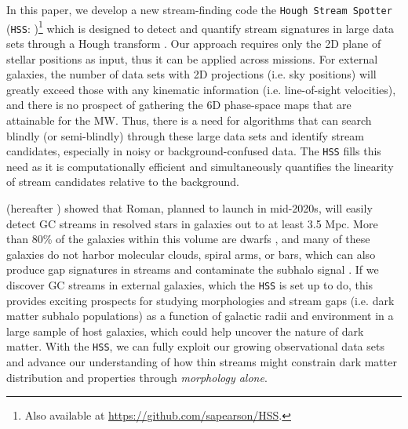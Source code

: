 \documentclass[twocolumn]{aastex631}
\begin{document}
In this paper, we develop a new stream-finding code the \texttt{Hough Stream Spotter} (\texttt{HSS}: \citealt{Pearson2021})\footnote{Also available at \url{https://github.com/sapearson/HSS}.} which is designed to detect and quantify stream signatures in large data sets through a Hough transform \citep{hough62}. Our approach requires only the 2D plane of stellar positions as input, thus it can be applied across missions. 
For external galaxies, the number of data sets with 2D projections (i.e. sky positions) will greatly exceed those with any kinematic information (i.e. line-of-sight velocities), and there is no prospect of gathering the 6D phase-space maps that are attainable for the MW. Thus, there is a need for algorithms that can search blindly (or semi-blindly) through these large data sets and identify stream candidates, especially in noisy or background-confused data. 
The \texttt{HSS} fills this need as it is computationally efficient and simultaneously quantifies the linearity of stream candidates relative to the background.

\citet{pearson19} (hereafter ) showed that Roman, planned to launch in mid-2020s, will easily detect GC streams in resolved stars in galaxies out to at least 3.5 Mpc. More than 80\% of the galaxies within this volume are dwarfs \citep[see][]{kara19}, and many of these galaxies do not harbor molecular clouds, spiral arms, or bars, which can also produce gap signatures in streams and contaminate the subhalo signal \citep{amorisco16, pearson17, erkal17, banik19}. 
If we discover GC streams in external galaxies, which the \texttt{HSS} is set up to do, this provides exciting prospects for studying morphologies and stream gaps (i.e. dark matter subhalo populations) as a function of galactic radii \citep[see e.g.,][]{kimmel17} and environment in a large sample of host galaxies, which could help uncover the nature of dark matter. 
With the \texttt{HSS}, we can fully exploit our growing observational data sets and advance our understanding of how  thin  streams  might  constrain  dark matter distribution  and  properties  through {\it morphology alone}. 
\end{document}
